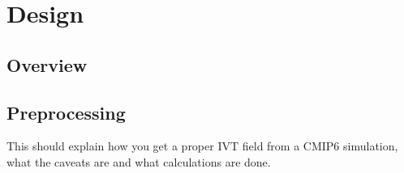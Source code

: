 \chapter{Design}
\label{ch:design}

\section{Overview}

\section{Preprocessing}

This should explain how you get a proper IVT field from a CMIP6 simulation, what the caveats are and what calculations are done. 



